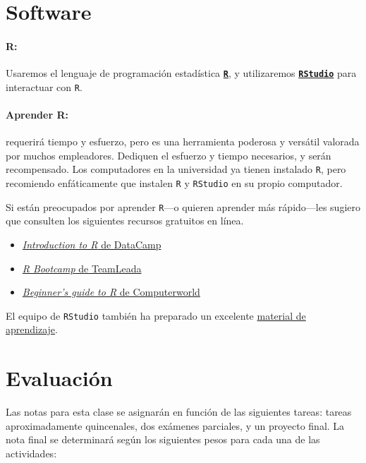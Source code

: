 \documentclass[10pt]{article}
\begin{document}
	\section*{Software}
	
	\paragraph{R:} Usaremos el lenguaje de programación estadística \href{https://www.r-project.org/}{\textbf{\texttt{R}}}, y utilizaremos \href{https://www.rstudio.com}{\textbf{\texttt{RStudio}}} para interactuar con \texttt{R}.
	
	\paragraph{Aprender R:} requerirá tiempo y esfuerzo, pero es una herramienta poderosa y versátil valorada por muchos empleadores. Dediquen el esfuerzo y tiempo necesarios, y serán recompensado. Los computadores en la universidad ya tienen instalado \texttt{R}, pero recomiendo enfáticamente que instalen \texttt{R} y \texttt{RStudio} en su propio computador.
	
	Si están preocupados por aprender \texttt{R}---o quieren aprender más rápido---les sugiero que consulten los siguientes recursos gratuitos en línea.
	\begin{itemize}
		\item \href{https://www.datacamp.com/courses/free-introduction-to-r}{\textit{Introduction to R} de DataCamp}
		\item \href{https://www.teamleada.com/courses/r-bootcamp}{\textit{R Bootcamp} de TeamLeada}
		\item \href{https://www.computerworld.com/article/2497143/business-intelligence-beginner-s-guide-to-r-introduction.html}{\textit{Beginner’s guide to R} de Computerworld}
	\end{itemize}
	El equipo de \texttt{RStudio} también ha preparado un excelente \href{https://education.rstudio.com/learn/beginner/}{material de aprendizaje}.
	
	\section*{Evaluación}
	
	Las notas para esta clase se asignarán en función de las siguientes tareas: tareas aproximadamente quincenales, dos exámenes parciales, y un proyecto final. La nota final se determinará según los siguientes pesos para cada una de las actividades:
	
\end{document}
